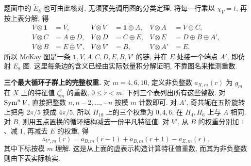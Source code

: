 \begin{solution}
题面中的 $\widetilde E_8$ 也可由此核对, 无须预先调用图的分类定理. 将每一行乘以 $\chi_V=t$, 再按上表分解, 得
\begin{align*}
V\otimes\mathbf1&=V,& V\otimes V&=\mathbf1\oplus A,& V\otimes A&=V\oplus C,\\
V\otimes C&=A\oplus D,& V\otimes D&=C\oplus E,& V\otimes E&=D\oplus B\oplus A',\\
V\otimes B&=E\oplus V',& V\otimes V'&=B,& V\otimes A'&=E.
\end{align*}
所以 McKay 图是一条 $\mathbf1,V,A,C,D,E,B,V'$ 的链, 并在 $E$ 处接一个端点 $A'$, 即仿射 $E_8$ 图. 这里每条边的含义已经由实际张量积分解证明, 不靠图名来推测重数.

\textbf{三个最大循环子群上的完整权重.}
对 $m=4,6,10$, 定义非负整数 $a_{X,m}(r)$ 为 $g_m$ 在 $X$ 上的特征值 $\zeta_m^r$ 的重数, $0\le r<m$. 下列三个表列出所有这些整数. 对 $\operatorname{Sym}^nV$, 直接把整数 $n,n-2,\ldots,-n$ 按模 $m$ 计数即可. 对 $A'$, 奇共轭在五阶旋转上把角 $2\pi/5$ 换成 $4\pi/5$, 所以 $H_{10}$ 上的三个权重为 $0,4,6$; 在 $H_4,H_6$ 上与 $A$ 相同. 对 $B$, 则用五点置换的循环结构减去一份平凡特征值. 对 $V'$, 从 $B$ 的权重分别加 $1$、减 $1$, 再减去 $E$ 的权重, 得
\[
 a_{V',m}(r)=a_{B,m}(r-1)+a_{B,m}(r+1)-a_{E,m}(r),
\]
其中下标按模 $m$ 理解. 这是从上面的虚表示构造计算特征值重数, 而其为非负整数则由下表实际核实.


\end{solution}
